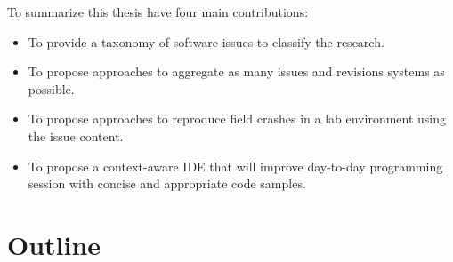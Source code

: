 To summarize this thesis have four main contributions:

\begin{itemize}
	\item To provide a taxonomy of software issues to classify the research.
	\item To propose approaches to aggregate as many issues and revisions systems as possible.
	\item To propose approaches to reproduce field crashes in a lab environment using the issue content.
	\item To propose a context-aware IDE that will improve day-to-day programming session with concise and appropriate code samples.
\end{itemize}

\section{Outline\label{sec:outline}}
